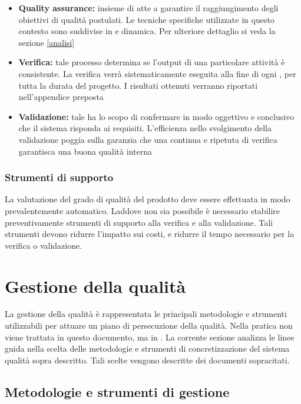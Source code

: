 \documentclass[12pt,a4paper]{article}
\begin{document}
	\begin{itemize}
		\item \textbf{Quality assurance:} insieme di  atte a garantire il raggiungimento degli obiettivi di qualità postulati. Le tecniche specifiche utilizzate in questo contesto sono suddivise in  e dinamica. Per ulteriore dettaglio si veda la sezione \ref{analisi}
		\item \textbf{Verifica:} tale processo determina se l'output di una particolare attività è consistente. La verifica verrà sistematicamente eseguita alla fine di ogni , per tutta la durata del progetto. I risultati ottenuti verranno riportati nell'appendice preposta
		\item \textbf{Validazione:} tale   ha lo scopo di confermare in modo oggettivo e conclusivo che il sistema risponda ai requisiti. L'efficienza nello svolgimento della validazione poggia sulla garanzia che una continua e ripetuta  di verifica garantisca una buona qualità interna
	\end{itemize}
	
	\subsubsection{Strumenti di supporto}
	La valutazione del grado di qualità del prodotto deve essere effettuata in modo prevalentemente automatico. Laddove non sia possibile è necessario stabilire preventivamente strumenti di supporto alla verifica e alla validazione. Tali strumenti devono ridurre l'impatto sui costi, e ridurre il tempo necessario per la verifica o validazione. 
	
	\newpage
	\section{Gestione della qualità} \label{gest_qual}
	
	La gestione della qualità è rappresentata le principali metodologie e strumenti utilizzabili per attuare un piano di persecuzione della qualità. 
	Nella pratica non viene trattata in questo documento, ma in \NdP. La corrente sezione analizza le linee guida nella scelta delle metodologie e strumenti di concretizzazione del sistema qualità sopra descritto. Tali scelte vengono descritte dei documenti sopracitati.
	
	\subsection{Metodologie e strumenti di gestione}
	
\end{document}

